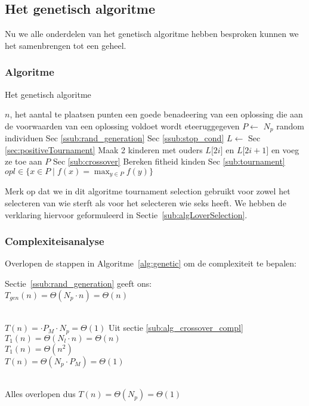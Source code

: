 %
\subsection{Het genetisch algoritme}
\label{ssub:genetic}
Nu we alle onderdelen van het genetisch algoritme hebben besproken kunnen we het samenbrengen tot een geheel.

\subsubsection{Algoritme}
	\begin{algorithm}[H]
	 	\caption{Het genetisch algoritme}
		\begin{algorithmic}
		\Require $n$, het aantal te plaatsen punten
		\Ensure een goede benadeering van een oplossing die aan de voorwaarden van een oplossing voldoet wordt eteeruggegeven
		\State $P \gets $ $N_p$ random individuen 
		\Comment Sec \ref{ssub:rand_generation}
		\Comment Sec \ref{ssub:stop_cond}
			\State $L \gets$  
			\Comment Sec \ref{sec:positiveTournament}
				\State Maak 2 kinderen met ouders 
				\State $L\lbrack2i\rbrack$ en  $L\lbrack2i+1\rbrack$ en voeg ze 
				\State toe aan $P$ 
				\Comment Sec \ref{sub:crossover}
				\State Bereken fitheid kinden
			\EndFor
			\State {} 
			\Comment Sec \ref{sub:tournament}
		\EndWhile 
		\State \Return  $\displaystyle opl \in \lbrace x \in P \mid f(x) = \max_{y\in P}{f(y)}  \rbrace$
		\EndFunction
		\end{algorithmic}
		\label{alg:genetic}
	\end{algorithm}		
    Merk op dat we in dit algoritme tournament selection gebruikt voor zowel het selecteren van wie sterft als voor het selecteren wie seks heeft. We hebben de verklaring hiervoor geformuleerd in Sectie~\ref{sub:algLoverSelection}. 
\subsubsection{Complexiteisanalyse}
  Overlopen de stappen in Algoritme~\ref{alg:genetic} om de complexiteit te bepalen:
\begin{enumerate}
	 Sectie~\ref{ssub:rand_generation} geeft ons:\\ $T_{gen}(n)=\Theta(N_p\cdot n) = \Theta(n)$ 
		\begin{enumerate}
			 \\$T(n)= \cdot P_M \cdot N_p = \Theta(1)$ 
			 Uit sectie \ref{sub:alg_crossover_compl}\\$T_{\text{1}}(n)= \Theta(N_l\cdot n) = \Theta(n)$
			 \\$T_{\text{1}}(n)= \Theta(n^2)$
			 \\$T(n)= \Theta(N_p\cdot P_M) = \Theta(1)$
		\end{enumerate}
		\\Alles overlopen dus $T(n)=\Theta(N_p)=\Theta(1)$
\end{enumerate}

